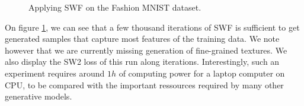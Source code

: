 \begin{figure}
\begin{centering}
\begin{tabular}{cccc|c}
\end{tabular}
\par\end{centering}
\caption{Applying SWF on the Fashion MNIST dataset.\label{fig:fashionmnist}}
\end{figure}

On figure \ref{fig:fashionmnist}, we can see that a few thousand iterations of SWF is sufficient to get generated samples that capture most features of the training data. We note however that we are currently missing generation of fine-grained textures. We also display the SW2 loss of this run along iterations. Interestingly, such an experiment requires around $1h$ of computing power for a laptop computer on CPU, to be compared with the important ressources required by many other generative models.

